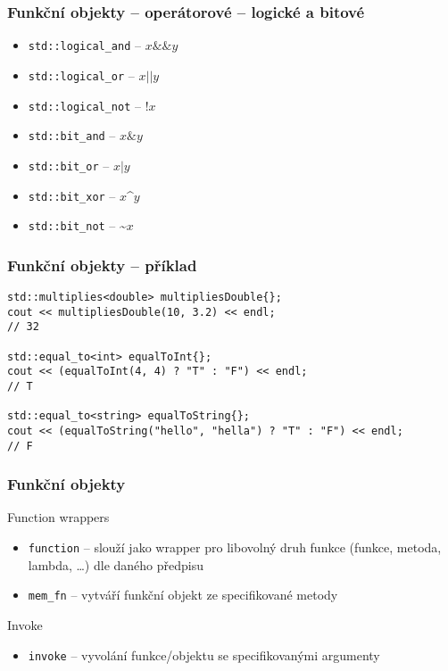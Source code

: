 \begin{frame}[fragile]
\frametitle{Funkční objekty -- operátorové -- logické a bitové}
\begin{block}{}
\begin{itemize}
\item \lstinline|std::logical_and| -- $x \&\& y$
\item \lstinline|std::logical_or| -- $x || y$
\item \lstinline|std::logical_not| -- $!x$
\item \lstinline|std::bit_and| -- $x \& y$
\item \lstinline|std::bit_or| -- $x | y$
\item \lstinline|std::bit_xor| -- $x $\^{}$ y$
\item \lstinline|std::bit_not| -- \~{}$x$
\end{itemize}
\end{block}
\end{frame}




\begin{frame}[fragile]
\frametitle{Funkční objekty -- příklad}
\begin{yesblock}
\begin{lstlisting}
std::multiplies<double> multipliesDouble{};
cout << multipliesDouble(10, 3.2) << endl; 
// 32

std::equal_to<int> equalToInt{};
cout << (equalToInt(4, 4) ? "T" : "F") << endl; 
// T

std::equal_to<string> equalToString{};
cout << (equalToString("hello", "hella") ? "T" : "F") << endl; 
// F
\end{lstlisting}
\end{yesblock}
\end{frame}

\newcommand{\impbullet}{\textcolor{red}{\LARGE\textbullet}}
\newcommand{\impbulletl}{\textcolor{red}{\large\textbullet}}


\begin{frame}[fragile]
\frametitle{Funkční objekty}
\begin{block}{Function wrappers}
\begin{itemize}
\item[\impbullet] \lstinline|function| -- slouží jako wrapper pro libovolný druh funkce (funkce, metoda, lambda, \ldots) dle daného předpisu
\item \lstinline|mem_fn| -- vytváří funkční objekt ze specifikované metody
\end{itemize}
\end{block}

\begin{block}{Invoke}
\begin{itemize}
\item \lstinline|invoke| -- vyvolání funkce/objektu se specifikovanými argumenty
\end{itemize}
\end{block}
\end{frame}



